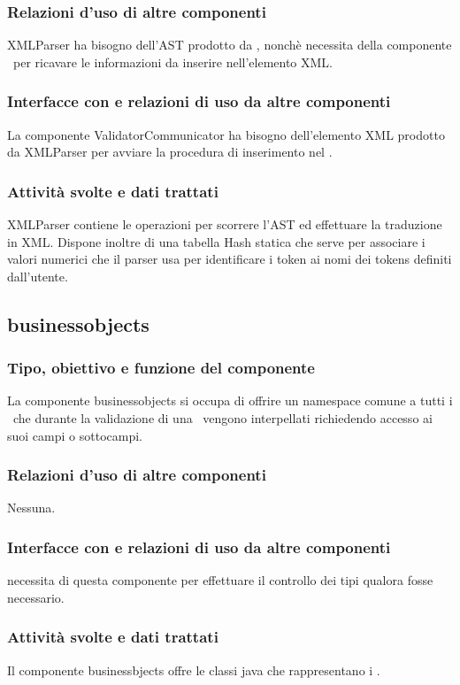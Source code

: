 \documentclass[11pt,titlepage,a4paper]{report}
\begin{document}
\subsubsection{Relazioni d'uso di altre componenti}
XMLParser ha bisogno dell'AST prodotto da \brp, nonch\`e necessita della componente \br\ per ricavare le informazioni da inserire nell'elemento XML.
\subsubsection{Interfacce con e relazioni di uso da altre componenti}
La componente ValidatorCommunicator ha bisogno dell'elemento XML prodotto da XMLParser per avviare la procedura di inserimento nel \re.
\subsubsection{Attivit\`a svolte e dati trattati}
XMLParser  contiene le operazioni per scorrere l'AST ed effettuare la traduzione in XML. Dispone inoltre di una tabella Hash statica che serve per associare i valori numerici che il parser usa per identificare i token ai nomi dei tokens definiti dall'utente.

\subsection{businessobjects}%
\subsubsection{Tipo, obiettivo e funzione del componente}
La componente businessobjects si occupa di offrire un namespace comune a tutti i \bos\ che durante la validazione di una \br\ vengono interpellati richiedendo accesso ai suoi campi o sottocampi.
\subsubsection{Relazioni d'uso di altre componenti}
Nessuna.
\subsubsection{Interfacce con e relazioni di uso da altre componenti}
\brp necessita di questa componente per effettuare il controllo dei tipi qualora fosse necessario.
\subsubsection{Attivit\`a svolte e dati trattati}
Il componente businessbjects offre le classi java che rappresentano i \bos.
\end{document}
